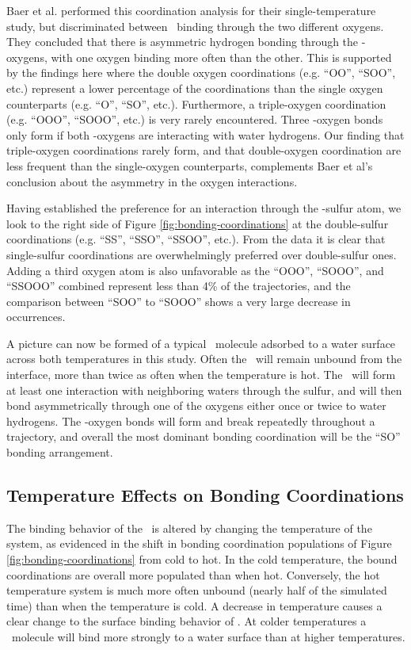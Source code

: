 \documentclass{article}
\begin{document}
Baer et al. performed this coordination analysis for their single-temperature study, but discriminated between \suldiox~binding through the two different oxygens. They concluded that there is asymmetric hydrogen bonding through the \suldiox-oxygens, with one oxygen binding more often than the other. This is supported by the findings here where the double oxygen coordinations (e.g. ``OO'', ``SOO'', etc.) represent a lower percentage of the coordinations than the single oxygen counterparts (e.g. ``O'', ``SO'', etc.). Furthermore, a triple-oxygen coordination (e.g. ``OOO'', ``SOOO'', etc.) is very rarely encountered. Three \suldiox-oxygen bonds only form if both \suldiox-oxygens are interacting with water hydrogens. Our finding that triple-oxygen coordinations rarely form, and that double-oxygen coordination are less frequent than the single-oxygen counterparts, complements Baer et al's conclusion about the asymmetry in the oxygen interactions.

Having established the preference for an interaction through the \suldiox-sulfur atom, we look to the right side of Figure \ref{fig:bonding-coordinations} at the double-sulfur coordinations (e.g. ``SS'', ``SSO'', ``SSOO'', etc.). From the data it is clear that single-sulfur coordinations are overwhelmingly preferred over double-sulfur ones. Adding a third oxygen atom is also unfavorable as the ``OOO'', ``SOOO'', and ``SSOOO'' combined represent less than 4\% of the trajectories, and the comparison between ``SOO'' to ``SOOO'' shows a very large decrease in occurrences.

A picture can now be formed of a typical \suldiox~molecule adsorbed to a water surface across both temperatures in this study. Often the \suldiox~will remain unbound from the interface, more than twice as often when the temperature is hot. The \suldiox~will form at least one interaction with neighboring waters through the sulfur, and will then bond asymmetrically through one of the oxygens either once or twice to water hydrogens. The \suldiox-oxygen bonds will form and break repeatedly throughout a trajectory, and overall the most dominant bonding coordination will be the ``SO'' bonding arrangement.

\subsection {Temperature Effects on Bonding Coordinations}

The binding behavior of the \suldiox~is altered by changing the temperature of the system, as evidenced in the shift in bonding coordination populations of Figure \ref{fig:bonding-coordinations} from cold to hot. In the cold temperature, the bound coordinations are overall more populated than when hot. Conversely, the hot temperature system is much more often unbound (nearly half of the simulated time) than when the temperature is cold. A decrease in temperature causes a clear change to the surface binding behavior of \suldiox. At colder temperatures a \suldiox~molecule will bind more strongly to a water surface than at higher temperatures.
\end{document}
